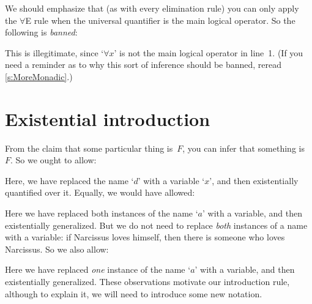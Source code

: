 We should emphasize that (as with every elimination rule) you can only apply the $\forall$E rule when the universal quantifier is the main logical operator. So the following is \emph{banned}:
\begin{fitchproof}
	\PR
\end{fitchproof}
This is illegitimate, since `$\forall x$' is not the main logical operator in line~1. (If you need a reminder as to why this sort of inference should be banned, reread \cref{s:MoreMonadic}.)

\section{Existential introduction}
From the claim that some particular thing is~$F$, you can infer that something is~$F$. So we ought to allow:
\begin{fitchproof}
	\PR
	 
\end{fitchproof}
Here, we have replaced the name `$d$' with a variable `$x$', and then existentially quantified over it. Equally, we would have allowed:
\begin{fitchproof}
	\PR
	 
\end{fitchproof}
Here we have replaced both instances of the name `$a$' with a variable, and then existentially generalized. But we do not need to replace \emph{both} instances of a name with a variable: if Narcissus loves himself, then there is someone who loves Narcissus. So we also allow:
\begin{fitchproof}
	\PR
	 
\end{fitchproof}
Here we have replaced \emph{one} instance of the name `$a$' with a variable, and then existentially generalized. These observations motivate our introduction rule, although to explain it, we will need to introduce some new notation.

